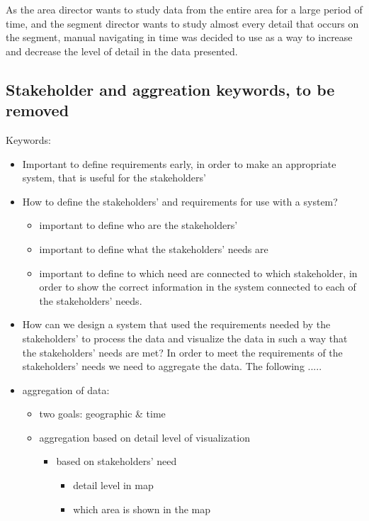 As the area director wants to study data from the entire area for a large 
period of time, and the segment director wants to study almost every detail 
that occurs on the segment, manual navigating in time was decided to use as a 
way to increase and decrease the level of detail in the data presented.


\subsection{Stakeholder and aggreation keywords, to be removed} %
\label{sub:stakeholder_and_aggreation_keywords}
Keywords:

\begin{itemize}
	\item Important to define requirements early, in order to make an appropriate system, that is useful for the stakeholders'
	\item How to define the stakeholders' and requirements for use with a system?
	\begin{itemize}
		\item important to define who are the stakeholders'
		\item important to define what the stakeholders' needs are
		\item important to define to which need are connected to which stakeholder, in order to show the correct information in the system connected to each of the stakeholders' needs.
	\end{itemize}
	\item How can we design a system that used the requirements needed by the stakeholders' to process the data and visualize the data in such a way that the stakeholders' needs are met?
	In order to meet the requirements of the stakeholders' needs we need to aggregate the data. The following .....
	\item aggregation of data:
	\begin{itemize}
		\item two goals: geographic \& time
		\item aggregation based on detail level of visualization
		\begin{itemize}
			\item based on stakeholders' need
			\begin{itemize}
				\item detail level in map
				\item which area is shown in the map

\end{itemize}
\end{itemize}
\end{itemize}
\end{itemize}

